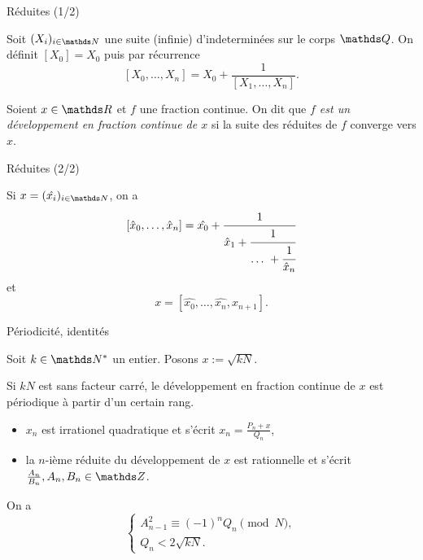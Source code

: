 \begin{frame}{Réduites (1/2)}

\begin{definition}
	Soit $(X_i)_{i\in \N}$ une suite (infinie) d'indeterminées sur le corps
	$\Q$. On définit $[X_0] = X_0$ puis par récurrence \[[X_0, \dots,
	X_n] = X_0 + \frac{1}{[X_1, \dots, X_n]}.\]
\end{definition}

\pause

\begin{definition}
Soient $x\in \R$ et $f$ une fraction continue. On dit que \emph{$f$ est un
développement en fraction continue de $x$} si la suite des réduites de $f$
converge vers $x$.
\end{definition}

\end{frame}

\begin{frame}{Réduites (2/2)}

Si $x = (\hat{x_i})_{i\in \N}$, on a \[[\hat{x}_0, \dots, \hat{x}_n] =
\hat{x_0} + \cfrac{1}{\hat{x}_1 + \cfrac{1}{\dots + \cfrac{1}{\hat{x}_n}}}\]
et \[x = [\hat{x_0}, \dots, \hat{x_n}, x_{n+1}].\]

\end{frame}

\begin{frame}{Périodicité, identités}

Soit $k\in \N^*$ un entier. Posons $x := \sqrt{kN}$.
\begin{proposition}
	Si $kN$ est sans facteur carré, le développement en fraction continue de
	$x$ est périodique à partir d'un certain rang.
\end{proposition}

\pause

\begin{itemize}
	\item $x_n$ est irrationel quadratique et s'écrit $x_n = \frac{P_n +
	x}{Q_n}$,
	\item la $n$-ième réduite du développement de $x$ est rationnelle et
	s'écrit $\frac{A_n}{B_n}, A_n, B_n \in \Z$.
\end{itemize}

\pause

On a
\[\begin{cases}
	A_{n-1}^2 \equiv (-1)^n Q_n \pmod{N}, \\
	Q_n < 2\sqrt{kN}.
\end{cases}\]

\end{frame}
